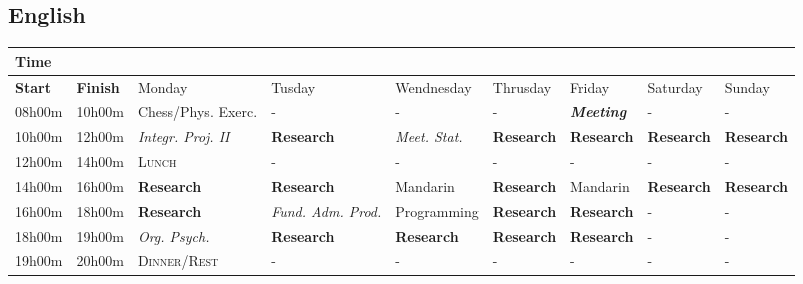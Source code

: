 \documentclass[11pt]{article}
\begin{document}
\clearpage
\subsection{English}
\label{sec:orgd7bb14f}
\large
\begin{center}
\begin{tabular}{lllllllll}
\hline
Time &  &  &  &  &  &  &  & \\
\hline
\textbf{Start} & \textbf{Finish} & Monday & Tusday & Wendnesday & Thrusday & Friday & Saturday & Sunday\\
\hline
08h00m & 10h00m & Chess/Phys. Exerc. & - & - & - & \textbf{\emph{Meeting}} & - & -\\
10h00m & 12h00m & \emph{Integr. Proj.  II} & \textbf{Research} & \emph{Meet.  Stat.} & \textbf{Research} & \textbf{Research} & \textbf{Research} & \textbf{Research}\\
\hline
12h00m & 14h00m & \textsc{Lunch} & - & - & - & - & - & -\\
14h00m & 16h00m & \textbf{Research} & \textbf{Research} & Mandarin & \textbf{Research} & Mandarin & \textbf{Research} & \textbf{Research}\\
\hline
16h00m & 18h00m & \textbf{Research} & \emph{Fund. Adm. Prod.} & Programming & \textbf{Research} & \textbf{Research} & - & -\\
18h00m & 19h00m & \emph{Org. Psych.} & \textbf{Research} & \textbf{Research} & \textbf{Research} & \textbf{Research} & - & -\\
19h00m & 20h00m & \textsc{Dinner/Rest} & - & - & - & - & - & -\\
\hline
\end{tabular}
\end{center}
\end{document}
